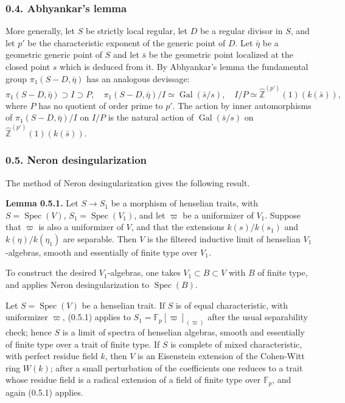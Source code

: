\documentclass[11pt]{article}
\providecommand{\Spec}{\operatorname{Spec}}
\providecommand{\Gal}{\operatorname{Gal}}
\providecommand{\Z}{\mathbb Z}
\begin{document}
\subsubsection*{0.4. Abhyankar's lemma}
More generally, let $S$ be strictly local regular, let $D$ be a regular divisor in $S$, and let $p'$ be the characteristic exponent of the generic point of $D$. Let $\bar\eta$ be a geometric generic point of $S$ and let $\bar s$ be the geometric point localized at the closed point $s$ which is deduced from it. By Abhyankar's lemma the fundamental group $\pi_1(S-D,\bar\eta)$ has an analogous devissage:
\[
\pi_1(S-D,\bar\eta)\supset I\supset P,
\quad \pi_1(S-D,\bar\eta)/I\simeq \Gal(\bar s/s),
\quad I/P\simeq \widehat{\Z}^{(p')}(1)(k(\bar s)),
\]
where $P$ has no quotient of order prime to $p'$. The action by inner automorphisms of $\pi_1(S-D,\bar\eta)/I$ on $I/P$ is the natural action of $\Gal(\bar s/s)$ on $\widehat{\Z}^{(p')}(1)(k(\bar s))$.

\subsubsection*{0.5. Neron desingularization}
The method of Neron desingularization gives the following result.

\textbf{Lemma 0.5.1.} Let $S\to S_1$ be a morphism of henselian traits, with $S=\Spec(V)$, $S_1=\Spec(V_1)$, and let $\varpi$ be a uniformizer of $V_1$. Suppose that $\varpi$ is also a uniformizer of $V$, and that the extensions $k(s)/k(s_1)$ and $k(\eta)/k(\eta_1)$ are separable. Then $V$ is the filtered inductive limit of henselian $V_1$-algebras, smooth and essentially of finite type over $V_1$.

To construct the desired $V_1$-algebras, one takes $V_1\subset B\subset V$ with $B$ of finite type, and applies Neron desingularization to $\Spec(B)$.

Let $S=\Spec(V)$ be a henselian trait. If $S$ is of equal characteristic, with uniformizer $\varpi$, (0.5.1) applies to $S_1=\mathbb F_p[\varpi]_{(\varpi)}$ after the usual separability check; hence $S$ is a limit of spectra of henselian algebras, smooth and essentially of finite type over a trait of finite type. If $S$ is complete of mixed characteristic, with perfect residue field $k$, then $V$ is an Eisenstein extension of the Cohen-Witt ring $W(k)$; after a small perturbation of the coefficients one reduces to a trait whose residue field is a radical extension of a field of finite type over $\mathbb F_p$, and again (0.5.1) applies.
\end{document}
